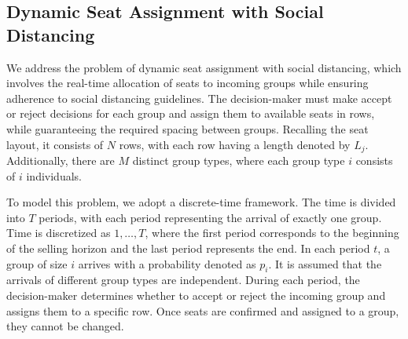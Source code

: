 


\subsection{Dynamic Seat Assignment with Social Distancing}\label{sec_dynamic}
We address the problem of dynamic seat assignment with social distancing, which involves the real-time allocation of seats to incoming groups while ensuring adherence to social distancing guidelines. The decision-maker must make accept or reject decisions for each group and assign them to available seats in rows, while guaranteeing the required spacing between groups. Recalling the seat layout, it consists of $N$ rows, with each row having a length denoted by $L_j$. Additionally, there are $M$ distinct group types, where each group type $i$ consists of $i$ individuals.


To model this problem, we adopt a discrete-time framework. The time is divided into $T$ periods, with each period representing the arrival of exactly one group. Time is discretized as $1, \ldots, T$, where the first period corresponds to the beginning of the selling horizon and the last period represents the end. In each period $t$, a group of size $i$ arrives with a probability denoted as $p_i$. It is assumed that the arrivals of different group types are independent. During each period, the decision-maker determines whether to accept or reject the incoming group and assigns them to a specific row. Once seats are confirmed and assigned to a group, they cannot be changed.


